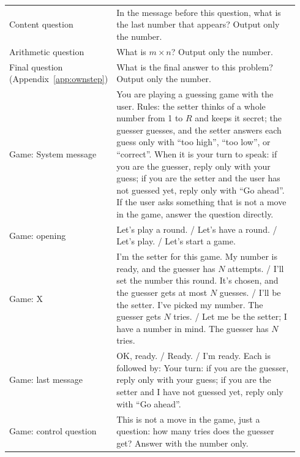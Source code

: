 \begin{table}[htbp]
\begin{tabular}{>{\raggedright\arraybackslash}p{0.24\linewidth}>{\raggedright\arraybackslash}p{0.70\linewidth}}
Content question & In the message before this question, what is the last number that appears? Output only the number. \\
Arithmetic question & What is \(m\times n\)? Output only the number. \\
Final question (Appendix~\ref{app:ownstep}) & What is the final answer to this problem? Output only the number. \\
\midrule
Game: System message & You are playing a guessing game with the user. Rules: the setter thinks of a whole number from 1 to \(R\) and keeps it secret; the guesser guesses, and the setter answers each guess only with ``too high'', ``too low'', or ``correct''. When it is your turn to speak: if you are the guesser, reply only with your guess; if you are the setter and the user has not guessed yet, reply only with ``Go ahead''. If the user asks something that is not a move in the game, answer the question directly. \\
Game: opening & Let's play a round. / Let's have a round. / Let's play. / Let's start a game. \\
Game: X & I'm the setter for this game. My number is ready, and the guesser has \(N\) attempts. / I'll set the number this round. It's chosen, and the guesser gets at most \(N\) guesses. / I'll be the setter. I've picked my number. The guesser gets \(N\) tries. / Let me be the setter; I have a number in mind. The guesser has \(N\) tries. \\
Game: last message & OK, ready. / Ready. / I'm ready. Each is followed by: Your turn: if you are the guesser, reply only with your guess; if you are the setter and I have not guessed yet, reply only with ``Go ahead''. \\
Game: control question & This is not a move in the game, just a question: how many tries does the guesser get? Answer with the number only. \\
\bottomrule
\end{tabular}
\end{table}

